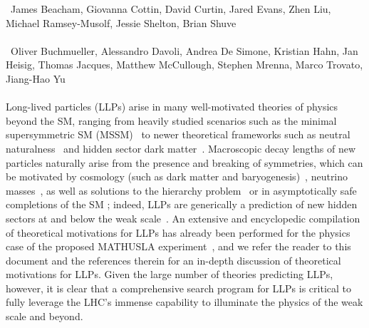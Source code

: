 ~James Beacham, Giovanna Cottin, David Curtin, Jared Evans, Zhen Liu, Michael Ramsey-Musolf, Jessie Shelton, Brian Shuve \\
\text{ \; }\\
~Oliver Buchmueller, Alessandro Davoli, Andrea De Simone, Kristian Hahn, Jan Heisig, Thomas Jacques, Matthew McCullough, Stephen Mrenna, Marco Trovato, Jiang-Hao Yu
\text{ \; }\\
\text{ \; }\\


\noindent Long-lived particles (LLPs) arise in many well-motivated theories of physics beyond the SM, ranging from  heavily studied scenarios such as the minimal supersymmetric SM (MSSM)~\cite{Fayet:1976et,Fayet:1977yc,Farrar:1978xj,Fayet:1979sa,Dimopoulos:1981zb} to newer theoretical frameworks such as neutral naturalness~\cite{Chacko:2005pe,Burdman:2006tz,Cai:2008au} and hidden sector dark matter~\cite{Boehm:2002yz,Boehm:2003ha,Pospelov:2007mp,Pospelov:2008zw,ArkaniHamed:2008qn,Pospelov:2008jd}.
Macroscopic decay lengths of new particles naturally arise from the presence and breaking of symmetries, which can be motivated by cosmology (such as dark matter and baryogenesis)~\cite{Bouquet:1986mq,Campbell:1990fa,Cui:2012jh,Barry:2013nva,Cui:2014twa,Cui:2015eba,Ipek:2016bpf,Feng:2008ya,Baumgart:2009tn,Kaplan:2009ag,Chan:2011aa,Dienes:2011ja,Dienes:2012yz,Kim:2013ivd}, neutrino masses~\cite{Fidalgo:2009dm,Ghosh:2012pq,Helo:2013esa,Antusch:2016vyf,Graesser:2007yj,Graesser:2007pc,Ghosh:2014rha,Izaguirre:2015pga,Maiezza:2015lza,Batell:2016zod,Das:2017zjc,Lara:2018rwv,Cottin:2018kmq,Nemevsek:2018bbt,Curtin:2018ees,Das:2018hph,Cvetic:2018elt}, as well as solutions to the hierarchy problem~\cite{Giudice:1998bp,Burdman:2006tz,Cai:2008au,Chacko:2005pe,Fan:2011yu,Barbier:2004ez,Csaki:2013jza,Arvanitaki:2012ps,ArkaniHamed:2012gw,deVries:2015mfw,Dercks:2018eua,Dercks:2018wum} or in asymptotically safe completions of the SM \cite{Bond:2017wut}; indeed, LLPs are generically a prediction of new hidden sectors at and below the weak scale~\cite{Chen:1995yu,Thomas:1998wy,Feng:1999fu,Strassler:2006im,Strassler:2006ri,Strassler:2006qa,Han:2007ae,Strassler:2008bv,Strassler:2008fv}. An extensive and encyclopedic compilation of theoretical motivations for LLPs has already been performed for the physics case of the proposed MATHUSLA experiment~\cite{Curtin:2018mvb}, and we refer the reader to this document and the references therein for an in-depth discussion of theoretical motivations for LLPs.
Given the large number of theories predicting LLPs, however, it is clear that a comprehensive search program for LLPs is critical to fully leverage the LHC's immense capability to illuminate the physics of the weak scale and beyond.

